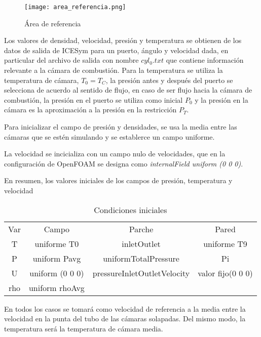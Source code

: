 \begin{figure}
    \centering
    \texttt{[image: area\_referencia.png]}
    \caption{Área de referencia}
    \label{fig:area_referencia}
\end{figure}

Los valores de densidad, velocidad, presión y temperatura se obtienen de los
datos de salida de ICESym para un puerto, ángulo y velocidad dada, en
particular del archivo de salida con nombre \emph{$cyl_0.txt$} que contiene
información relevante a la cámara de combustión.
%
Para la temperatura se utiliza la temperatura de cámara, $T_0 = T_C$, la
presión antes y después del puerto se selecciona de acuerdo al sentido de
flujo, en caso de ser flujo hacia la cámara de combustión, la presión en el
puerto se utiliza como inicial $P_0$ y la presión en la cámara es la
aproximación a la presión en la restricción $P_T$.

Para inicializar el campo de presión y densidades, se usa la media entre las
cámaras que se estén simulando y se establerce un campo uniforme.

La velocidad se incicializa con un campo nulo de velocidades, que en la
configuración de OpenFOAM se designa como \emph{internalField uniform (0 0 0)}.

En resumen, los valores iniciales de los campos de presión, temperatura y velocidad

\begin{table}
\centering
    \begin{tabular}{cccc} \toprule
        Var & Campo         & Parche                      & Pared \\
        T   & uniforme T0   & inletOutlet                 & uniforme T9\\ \midrule
        P   & uniform Pavg  & uniformTotalPressure        & Pi \\
        U   & uniform (0 0 0) & pressureInletOutletVelocity & valor fijo(0 0 0)\\
        rho & uniform rhoAvg \\ \bottomrule
    \end{tabular}
    \caption{Condiciones iniciales} \label{tab:cc}
\end{table}

En todos los casos se tomará como velocidad de referencia a la media entre la
velocidad en la punta del tubo de las cámaras solapadas.
%
Del mismo modo, la temperatura será la temperatura de cámara media.

